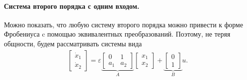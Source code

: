 \documentclass[../main.tex]{subfiles}
\begin{document}
\paragraph{Система второго порядка с одним входом.}
Можно показать, что любую систему второго порядка можно привести к форме Фробениуса c помощью эквивалентных преобразований.
Поэтому, не теряя общности, будем рассматривать системы вида
 \begin{gather}\label{sec1:system32}
     \left[ {\begin{array}{*{20}{c}}
             {{{\dot x}_1}}\\
             {{{\dot x}_2}}
     \end{array}} \right] = \varepsilon \underbrace {\left[ {\begin{array}{*{20}{c}}
                 0&1\\
                 a_1&a_2
         \end{array}} \right]}_A\left[ {\begin{array}{*{20}{c}}
             {{x_1}}\\
             {{x_2}}
     \end{array}} \right] + \underbrace {\left[ {\begin{array}{*{20}{c}}
                 0\\
                 1
         \end{array}} \right]}_Bu.
 \end{gather}
 
\end{document}
